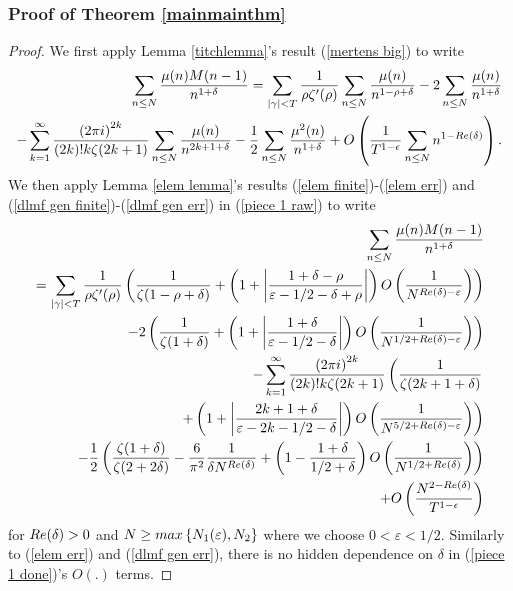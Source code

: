 \documentclass[11pt,article]{amsart}
\numberwithin{equation}{section}
\numberwithin{equation}{section}
\numberwithin{lemma}{section}
\numberwithin{prop}{section}
\begin{document}
\subsubsection{Proof of Theorem \ref{mainmainthm}}
\begin{proof}
We first apply Lemma \ref{titchlemma}'s result (\ref{mertens big}) to write
\begin{align}
\sum_{n\leq N}\frac{\mu(n)M(n-1)}{n^{1+\delta}}=\sum_{\left|\gamma\right|<T}\frac{1}{\rho\zeta'(\rho)}\sum_{n\leq N}\frac{\mu(n)}{n^{1-\rho+\delta}}-2\sum_{n\leq N}\frac{\mu(n)}{n^{1+\delta}}\nonumber \\ -\sum_{k=1}^{\infty}\frac{\left(2\pi i\right)^{2k}}{(2k)!k\zeta(2k+1)}\sum_{n\leq N}\frac{\mu(n)}{n^{2k+1+\delta}}-\frac{1}{2}\sum_{n\leq N}\frac{\mu^{2}(n)}{n^{1+\delta}}+O\left(\frac{1}{T^{1-\epsilon}}\sum_{n\leq N}n^{1-\textnormal{Re}(\delta)}\right). \label{piece 1 raw}
\end{align}
We then apply Lemma \ref{elem lemma}'s results (\ref{elem finite})-(\ref{elem err}) and (\ref{dlmf gen finite})-(\ref{dlmf gen err}) in (\ref{piece 1 raw}) to write
\begin{align}
\sum_{n\leq N}\frac{\mu(n)M(n-1)}{n^{1+\delta}}\nonumber \\=\sum_{\left|\gamma\right|<T}\frac{1}{\rho\zeta'(\rho)}\left(\frac{1}{\zeta(1-\rho+\delta)}+\left(1+\left|\frac{1+\delta-\rho}{\varepsilon-1/2-\delta+\rho}\right|\right)O\left(\frac{1}{N^{\textnormal{Re}(\delta)-\varepsilon}}\right)\right)\nonumber \\ -2\left(\frac{1}{\zeta(1+\delta)}+\left(1+\left|\frac{1+\delta}{\varepsilon-1/2-\delta}\right|\right)O\left(\frac{1}{N^{1/2+\textnormal{Re}(\delta)-\varepsilon}}\right)\right) \nonumber \\-\sum_{k=1}^{\infty}\frac{\left(2\pi i\right)^{2k}}{(2k)!k\zeta(2k+1)}\left(\frac{1}{\zeta(2k+1+\delta)} \right. \nonumber \\ \left. +\left(1+\left|\frac{2k+1+\delta}{\varepsilon-2k-1/2-\delta}\right|\right)O\left(\frac{1}{N^{5/2+\textnormal{Re}(\delta)-\varepsilon}}\right)\right) \nonumber \\-\frac{1}{2}\left(\frac{\zeta(1+\delta)}{\zeta(2+2\delta)}-\frac{6}{\pi^{2}}\frac{1}{\delta N^{\textnormal{Re}(\delta)}}+\left(1-\frac{1+\delta}{1/2+\delta}\right)O\left(\frac{1}{N^{1/2+\textnormal{Re}(\delta)}}\right)\right) \nonumber \\ +O\left(\frac{N^{2-\textnormal{Re}(\delta)}}{T^{1-\epsilon}}\right)\label{piece 1 done}
\end{align}
for $\textnormal{Re}(\delta)>0$ and $N\geq \textnormal{max}\left\{N_{1}(\varepsilon), N_{2}\right\}$ where we choose $0<\varepsilon<1/2$. Similarly to (\ref{elem err}) and (\ref{dlmf gen err}), there is no hidden dependence on $\delta$ in (\ref{piece 1 done})'s $O(.)$ terms. 


\end{proof}
\end{document}
